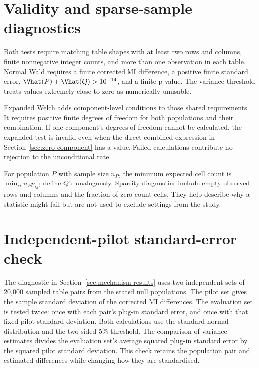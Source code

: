 \section{Validity and sparse-sample diagnostics}
\label{sec:validity-rules}

Both tests require matching table shapes with at least two rows and columns,
finite nonnegative integer counts, and more than one observation in each
table. Normal Wald requires a finite corrected MI difference, a positive
finite standard error, \(\Vhat(P)+\Vhat(Q)>10^{-14}\), and a finite p-value.
The variance threshold treats values extremely close to zero as numerically
unusable.

Expanded Welch adds component-level conditions to those shared requirements.
It requires positive finite degrees of freedom for both populations and
their combination. If one component's degrees of freedom cannot be
calculated, the expanded test is invalid even when the direct combined
expression in Section~\ref{sec:zero-component} has a value. Failed
calculations contribute no rejection to the unconditional rate.

For population \(P\) with sample size \(n_P\), the minimum expected cell
count is \(\min_{ij}n_Pp_{ij}\); define \(Q\)'s analogously. Sparsity
diagnostics include empty observed rows and columns and the fraction of
zero-count cells. They help describe why a statistic might fail but are not
used to exclude settings from the study.

\section{Independent-pilot standard-error check}

The diagnostic in Section~\ref{sec:mechanism-results} uses two independent
sets of 20,000 sampled table pairs from the stated null populations. The
pilot set gives the sample standard deviation of the corrected MI
differences. The evaluation set is tested twice: once with each pair's
plug-in standard error, and once with that fixed pilot standard deviation.
Both calculations use the standard normal distribution and the two-sided
5\% threshold. The comparison of variance estimates divides the evaluation
set's average squared plug-in standard error by the squared pilot standard
deviation. This check retains the population pair and estimated differences
while changing how they are standardised.
